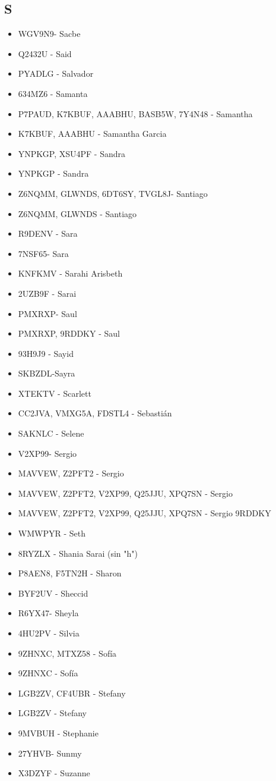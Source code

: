 \subsection*{S}
\begin{itemize}[leftmargin=*,nosep]
\item WGV9N9- Sacbe
\item Q2432U - Said
\item PYADLG - Salvador
\item 634MZ6 - Samanta
\item P7PAUD, K7KBUF, AAABHU, BASB5W, 7Y4N48 - Samantha
\item K7KBUF, AAABHU - Samantha Garcia
\item YNPKGP, XSU4PF - Sandra
\item YNPKGP - Sandra
\item Z6NQMM, GLWNDS, 6DT6SY, TVGL8J- Santiago
\item Z6NQMM, GLWNDS - Santiago
\item R9DENV - Sara
\item 7NSF65- Sara
\item KNFKMV - Sarahi Arisbeth
\item 2UZB9F - Sarai
\item PMXRXP- Saul
\item PMXRXP, 9RDDKY - Saul
\item 93H9J9 - Sayid
\item SKBZDL-Sayra
\item XTEKTV - Scarlett
\item CC2JVA, VMXG5A, FDSTL4 - Sebastián
\item SAKNLC - Selene
\item V2XP99- Sergio
\item MAVVEW, Z2PFT2 - Sergio
\item MAVVEW, Z2PFT2, V2XP99, Q25JJU, XPQ7SN - Sergio
\item MAVVEW, Z2PFT2, V2XP99, Q25JJU, XPQ7SN - Sergio 9RDDKY
\item WMWPYR - Seth
\item 8RYZLX - Shania Sarai (sin "h")
\item P8AEN8, F5TN2H - Sharon
\item BYF2UV - Sheccid
\item R6YX47- Sheyla
\item 4HU2PV - Silvia
\item 9ZHNXC, MTXZ58 - Sofía
\item 9ZHNXC - Sofía
\item LGB2ZV, CF4UBR - Stefany
\item LGB2ZV - Stefany
\item 9MVBUH - Stephanie
\item 27YHVB- Sunmy
\item X3DZYF - Suzanne
\end{itemize}

